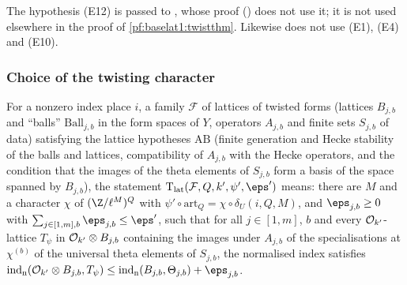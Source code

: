 \begin{remark}\label{pf:baselat1:rem:gw}
The hypothesis (E12) is passed to ,
whose proof () does not use it; it is not used elsewhere in the
proof of \cref{pf:baselat1:twistthm}. Likewise  does not
use (E1), (E4) and (E10).
\end{remark}

\subsubsection{Choice of the twisting character}

For a nonzero index place $i$, a family $\mathcal F$ of lattices of twisted forms (lattices
$B_{j,b}$ and ``balls'' $\mathrm{Ball}_{j,b}$ in the form spaces of $Y$, operators $A_{j,b}$ and finite sets
$S_{j,b}$ of data) satisfying the lattice hypotheses $\mathrm{AB}$ (finite generation and Hecke stability of the
balls and lattices, compatibility of $A_{j,b}$ with the Hecke operators, and the condition that the images of the
theta elements of $S_{j,b}$ form a basis of the space spanned by $B_{j,b}$), the statement $\mathrm{T}_{\mathrm{lat}}(\mathcal
F,Q,k',\psi',\eps')$ means: there are $M$ and a character $\chi$ of $(\Z/\ell^M)^Q$ with
$\psi'\circ\mathrm{art}_Q=\chi\circ\delta_U(i,Q,M)$, and $\eps_{j,b}\ge0$ with $\sum_{j\in[1,m],b}\eps_{j,b}\le\eps'$,
such that for all $j\in[1,m]$, $b$ and every $\mathcal O_{k'}$-lattice $T_\psi$ in
$\mathcal O_{k'}\otimes B_{j,b}$ containing the images under $A_{j,b}$ of the specialisations at $\chi^{(b)}$ of
the universal theta elements of $S_{j,b}$, the normalised index satisfies
$\operatorname{ind}_{\mathrm n}(\baselatoneO_{k'}\otimes B_{j,b},T_\psi)\le\operatorname{ind}_{\mathrm n}(B_{j,b},\Theta_{j,b})+\eps_{j,b}$.

